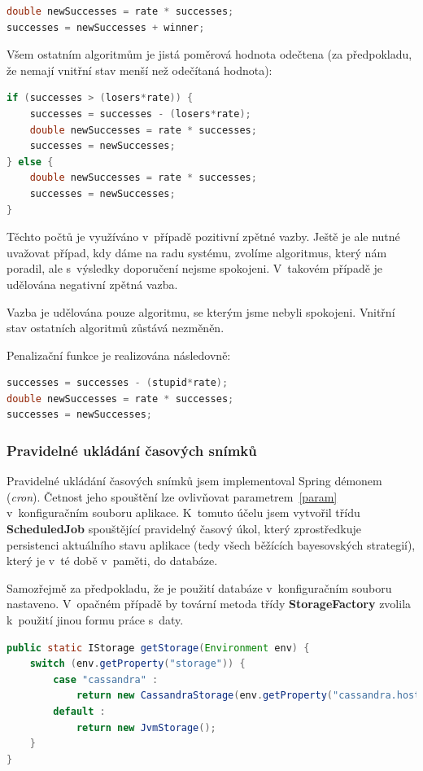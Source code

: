 \documentclass[thesis=M,czech]{FITthesis}[2014/05/07]
\begin{document}
\begin{lstlisting}[language=java]
double newSuccesses = rate * successes;
successes = newSuccesses + winner;
\end{lstlisting}	

Všem ostatním algoritmům je jistá poměrová hodnota odečtena (za předpokladu, že nemají vnitřní stav menší než odečítaná hodnota):

\begin{lstlisting}[language=java]
if (successes > (losers*rate)) {
    successes = successes - (losers*rate);
    double newSuccesses = rate * successes;
    successes = newSuccesses;
} else {
    double newSuccesses = rate * successes;
    successes = newSuccesses;            
}
\end{lstlisting}	

Těchto počtů je využíváno v~případě pozitivní zpětné vazby. Ještě je ale nutné uvažovat případ, kdy dáme na radu systému, zvolíme algoritmus, který nám poradil, ale s~výsledky doporučení nejsme spokojeni. V~takovém případě je udělována negativní zpětná vazba.

Vazba je udělována pouze algoritmu, se kterým jsme nebyli spokojeni. Vnitřní stav ostatních algoritmů zůstává nezměněn.

Penalizační funkce je realizována následovně:

\begin{lstlisting}[language=java]
successes = successes - (stupid*rate);
double newSuccesses = rate * successes;
successes = newSuccesses;
\end{lstlisting}	
  
\subsubsection{Pravidelné ukládání časových snímků}
\label{task}
Pravidelné ukládání časových snímků jsem implementoval Spring démonem (\emph{cron}). Četnost jeho spouštění lze ovlivňovat parametrem~\ref{param} v~konfiguračním souboru aplikace. K~tomuto účelu jsem vytvořil třídu \textbf{ScheduledJob} spouštějící pravidelný časový úkol, který zprostředkuje persistenci aktuálního stavu aplikace (tedy všech běžících bayesovských strategií), který je v~té době v~paměti, do databáze.

Samozřejmě za předpokladu, že je použití databáze v~konfiguračním souboru nastaveno. V~opačném případě by tovární metoda třídy \textbf{StorageFactory} zvolila k~použití jinou formu práce s~daty.

\begin{lstlisting}[language=java]
public static IStorage getStorage(Environment env) {
    switch (env.getProperty("storage")) {
        case "cassandra" : 
            return new CassandraStorage(env.getProperty("cassandra.host"), env.getProperty("cassandra.keyspace"));                
        default : 
            return new JvmStorage();
    }
}
\end{lstlisting}
\end{document}
